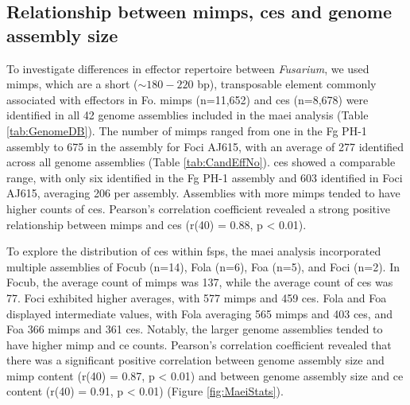 \subsection{Relationship between \acp{mimp}, \aclp{ce} and genome assembly size}


To investigate differences in effector repertoire between \textit{Fusarium}, we used \acp{mimp}, which are a short ($\sim180 - 220$ bp), transposable element commonly associated with effectors in \ac{Fo}. \Acp{mimp} (n=11,652) and \acfp{ce} (n=8,678) were identified in all 42 genome assemblies included in the \ac{maei} analysis (Table \ref{tab:GenomeDB}). The number of \acp{mimp} ranged from one in the \ac{Fg} PH-1 assembly to 675 in the assembly for \ac{Foci} AJ615, with an average of 277 identified across all genome assemblies (Table \ref{tab:CandEffNo}). \Acp{ce} showed a comparable range, with only six identified in the \ac{Fg} PH-1 assembly and 603 identified in \ac{Foci} AJ615, averaging 206 per assembly. Assemblies with more \acp{mimp} tended to have higher counts of \acp{ce}. Pearson's correlation coefficient revealed a strong positive relationship between \acp{mimp} and \acp{ce} (r(40) = 0.88, p < 0.01). 



To explore the distribution of \acp{ce} within \acp{fsp}, the \ac{maei} analysis incorporated multiple assemblies of \ac{Focub} (n=14), \ac{Fola} (n=6), \ac{Foa} (n=5), and \ac{Foci} (n=2). In \ac{Focub}, the average count of \acp{mimp} was 137, while the average count of \acp{ce} was 77. \ac{Foci} exhibited higher averages, with 577 \acp{mimp} and 459 \acp{ce}. \ac{Fola} and \ac{Foa} displayed intermediate values, with \ac{Fola} averaging 565 \acp{mimp} and 403 \acp{ce}, and \ac{Foa} 366 \acp{mimp} and 361 \acp{ce}. Notably, the larger genome assemblies tended to have higher \ac{mimp} and \ac{ce} counts. Pearson's correlation coefficient revealed that there was a significant positive correlation between genome assembly size and \ac{mimp} content (r(40) = 0.87, p < 0.01) and between genome assembly size and \ac{ce} content (r(40) = 0.91, p < 0.01) (Figure \ref{fig:MaeiStats}). 

